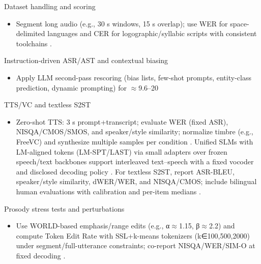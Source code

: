\documentclass{article}
\begin{document}
Dataset handling and scoring
\begin{itemize}
  \item Segment long audio (e.g., 30 s windows, 15 s overlap); use WER for space-delimited languages and CER for logographic/syllabic scripts with consistent toolchains \cite{nguyen2025qwenvsgemmaintegrationwhispercomparative}.
\end{itemize}

Instruction-driven ASR/AST and contextual biasing
\begin{itemize}
  \item Apply LLM second-pass rescoring (bias lists, few-shot prompts, entity-class prediction, dynamic prompting) for $\approx$9.6--20%
\end{itemize}

TTS/VC and textless S2ST
\begin{itemize}
  \item Zero-shot TTS: 3 s prompt+transcript; evaluate WER (fixed ASR), NISQA/CMOS/SMOS, and speaker/style similarity; normalize timbre (e.g., FreeVC) and synthesize multiple samples per condition \cite{wang2024evaluatingtextspeechsynthesislargediscre}. Unified SLMs with LM-aligned tokens (LM-SPT/LAST) via small adapters over frozen speech/text backbones support interleaved text--speech with a fixed vocoder and disclosed decoding policy \cite{turetzky2024lastlanguagemodelawarespeechtokenization,wang2023slmbridgethingapbetweenspeechtextfoundat,jo2025lmsptalignedsemanticdistillationspeechto}. For textless S2ST, report ASR-BLEU, speaker/style similarity, dWER/WER, and NISQA/CMOS; include bilingual human evaluations with calibration and per-item medians \cite{peng2024mslms2stmultitaskspeechlanguagemodeltext,li2024investigatingneuralaudiocodecsspeechlang,huang2023holisticcascadesystembenchmarkhumanevalu}.
\end{itemize}

Prosody stress tests and perturbations
\begin{itemize}
  \item Use WORLD-based emphasis/range edits (e.g., α$\approx$1.15, β$\approx$2.2) and compute Token Edit Rate with SSL+k-means tokenizers (k∈{100,500,2000}) under segment/full-utterance constraints; co-report NISQA/WER/SIM-O at fixed decoding \cite{li2024investigatingneuralaudiocodecsspeechlang}.
\end{itemize}
\end{document}
